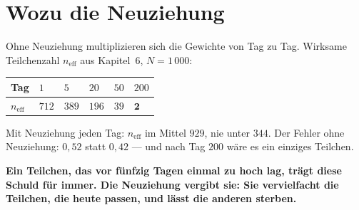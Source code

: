 \section{Wozu die Neuziehung}

\begin{merksatz}
Ohne Neuziehung multiplizieren sich die Gewichte von Tag zu Tag. Wirksame Teilchenzahl $n_{\text{eff}}$ aus Kapitel~6, $N = 1\,000$:

\begin{center}
{\small
\renewcommand{\arraystretch}{1.48}
\begin{tabular}{@{}P{1.4cm}P{1.4cm}P{1.4cm}P{1.4cm}P{1.4cm}P{1.4cm}@{}}
\toprule
\textbf{Tag} & $1$ & $5$ & $20$ & $50$ & $200$\\
\midrule
$n_{\text{eff}}$ & $712$ & $389$ & $196$ & $39$ & $\mathbf{2}$\\
\bottomrule
\end{tabular}}
\end{center}
Mit Neuziehung jeden Tag: $n_{\text{eff}}$ im Mittel $929$, nie unter $344$. Der Fehler ohne Neuziehung: $0{,}52$ statt $0{,}42$ --- und nach Tag $200$ wäre es ein einziges Teilchen.

\begin{center}
\begin{minipage}{0.9\textwidth}
\textbf{Ein Teilchen, das vor fünfzig Tagen einmal zu hoch lag, trägt diese Schuld für immer. Die Neuziehung vergibt sie: Sie vervielfacht die Teilchen, die heute passen, und lässt die anderen sterben.}
\end{minipage}
\end{center}

\begin{center}
\begin{minipage}{0.88\textwidth}
\end{minipage}
\end{center}
\end{merksatz}

